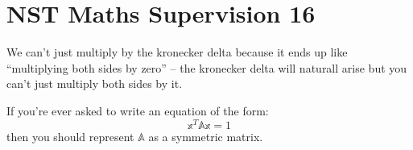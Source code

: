 \documentclass[10pt, a4paper]{article}
\begin{document}
\section*{NST Maths Supervision 16}

We can't just multiply by the kronecker delta because it ends up like
``multiplying both sides by zero'' -- the kronecker delta will naturall arise but you
can't just multiply both sides by it.

If you're ever asked to write an equation of the form:
\[
\mathbb{x}^T\mathbb{A}\mathbb{x} = 1
\]
then you should represent $\mathbb{A}$ as a symmetric matrix.
\end{document}
